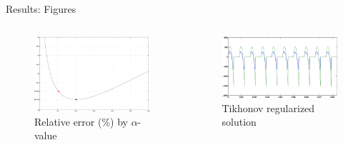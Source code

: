 \documentclass[final]{beamer}
\begin{document}
\begin{frame}[t]
\begin{columns}[t]
\begin{column}{.465\textwidth}
\begin{block}{Results: Figures}
\begin{columns}
\end{columns}

\vspace{1cm}

\begin{columns}

\begin{column}{.5\textwidth}
\begin{center}
\begin{figure}
\includegraphics[width=.95\linewidth]{alpha_errs_iter.eps}
\caption{Relative error (\%) by $\alpha$-value}
\label{fig:alpha-iter}
\end{figure}
\end{center}
\end{column}

\begin{column}{.5\textwidth}
\begin{center}
\begin{figure}
\includegraphics[width=.95\linewidth]{alpha_errs_morozov.eps}
\caption{Tikhonov regularized solution}
\label{fig:iter-tik}
\end{figure}
\end{center}
\end{column}


\end{columns}
\end{block}
\end{column}
\end{columns}
\end{frame}
\end{document}
